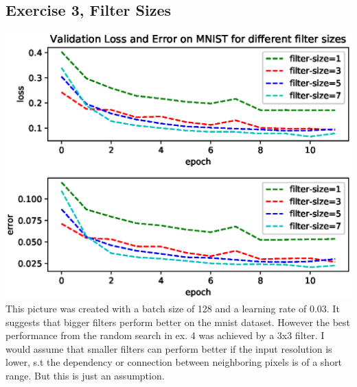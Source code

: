 \documentclass{scrartcl}
\begin{document}
\subsection*{Exercise 3, Filter Sizes}
\includegraphics[scale=1]{Ex3.eps}
This picture was created with a batch size of 128 and a learning rate of 0.03. It suggests that bigger filters perform better on the mnist dataset.
However the best performance from the random search in ex. 4 was achieved by a 3x3 filter.
I would assume that smaller filters can perform better if the input resolution is lower, s.t the dependency or connection between neighboring pixels is of a short range. But this is just an assumption.
\end{document}
